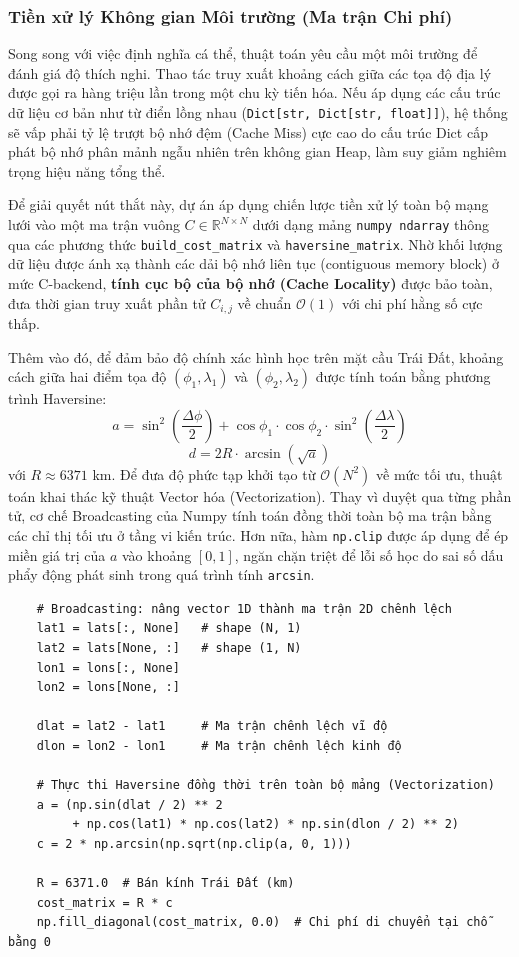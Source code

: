 \documentclass[12pt,a4paper]{article}
\numberwithin{figure}{subsection}
\numberwithin{table}{subsection}
\newcounter{codecounter}
\newenvironment{codeblock}[2]{%
    \refstepcounter{codecounter}%
    \phantomsection%
    \label{#1}%
    \par\smallskip
}{%
    \par\smallskip
}
\begin{document}
\subsubsection{Tiền xử lý Không gian Môi trường (Ma trận Chi phí)}

Song song với việc định nghĩa cá thể, thuật toán yêu cầu một môi trường để đánh giá độ thích nghi. Thao tác truy xuất khoảng cách giữa các tọa độ địa lý được gọi ra hàng triệu lần trong một chu kỳ tiến hóa. Nếu áp dụng các cấu trúc dữ liệu cơ bản như từ điển lồng nhau (\texttt{Dict[str, Dict[str, float]]}), hệ thống sẽ vấp phải tỷ lệ trượt bộ nhớ đệm (Cache Miss) cực cao do cấu trúc Dict cấp phát bộ nhớ phân mảnh ngẫu nhiên trên không gian Heap, làm suy giảm nghiêm trọng hiệu năng tổng thể.

Để giải quyết nút thắt này, dự án áp dụng chiến lược tiền xử lý toàn bộ mạng lưới vào một ma trận vuông $C \in \mathbb{R}^{N \times N}$ dưới dạng mảng \texttt{numpy ndarray} thông qua các phương thức \texttt{build\_cost\_matrix} và \texttt{haversine\_matrix}. Nhờ khối lượng dữ liệu được ánh xạ thành các dải bộ nhớ liên tục (contiguous memory block) ở mức C-backend, \textbf{tính cục bộ của bộ nhớ (Cache Locality)} được bảo toàn, đưa thời gian truy xuất phần tử $C_{i,j}$ về chuẩn $\mathcal{O}(1)$ với chi phí hằng số cực thấp.

Thêm vào đó, để đảm bảo độ chính xác hình học trên mặt cầu Trái Đất, khoảng cách giữa hai điểm tọa độ $(\phi_1, \lambda_1)$ và $(\phi_2, \lambda_2)$ được tính toán bằng phương trình Haversine:
\[ a = \sin^2\!\left(\dfrac{\Delta\phi}{2}\right) + \cos\phi_1 \cdot \cos\phi_2 \cdot \sin^2\!\left(\dfrac{\Delta\lambda}{2}\right) \]
\[ d = 2R \cdot \arcsin(\sqrt{a}) \]
với $R \approx 6371$ km. Để đưa độ phức tạp khởi tạo từ $\mathcal{O}(N^2)$ về mức tối ưu, thuật toán khai thác kỹ thuật Vector hóa (Vectorization). Thay vì duyệt qua từng phần tử, cơ chế Broadcasting của Numpy tính toán đồng thời toàn bộ ma trận bằng các chỉ thị tối ưu ở tầng vi kiến trúc. Hơn nữa, hàm \texttt{np.clip} được áp dụng để ép miền giá trị của $a$ vào khoảng $[0, 1]$, ngăn chặn triệt để lỗi số học do sai số dấu phẩy động phát sinh trong quá trình tính \texttt{arcsin}.

\begin{codeblock}{app:code:cost-matrix}{Xây dựng ma trận chi phí}
\begin{verbatim}
    # Broadcasting: nâng vector 1D thành ma trận 2D chênh lệch
    lat1 = lats[:, None]   # shape (N, 1)
    lat2 = lats[None, :]   # shape (1, N)
    lon1 = lons[:, None]
    lon2 = lons[None, :]

    dlat = lat2 - lat1     # Ma trận chênh lệch vĩ độ
    dlon = lon2 - lon1     # Ma trận chênh lệch kinh độ

    # Thực thi Haversine đồng thời trên toàn bộ mảng (Vectorization)
    a = (np.sin(dlat / 2) ** 2
         + np.cos(lat1) * np.cos(lat2) * np.sin(dlon / 2) ** 2)
    c = 2 * np.arcsin(np.sqrt(np.clip(a, 0, 1)))

    R = 6371.0  # Bán kính Trái Đất (km)
    cost_matrix = R * c
    np.fill_diagonal(cost_matrix, 0.0)  # Chi phí di chuyển tại chỗ bằng 0
\end{verbatim}
\end{codeblock}
\end{document}
